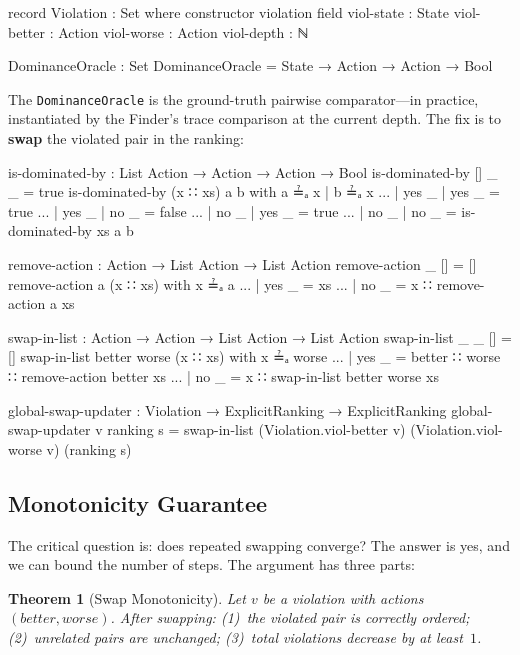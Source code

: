 \documentclass[9pt,a4paper]{article}
\theoremstyle{plain}
\newtheorem{theorem}{Theorem}
\theoremstyle{definition}
\theoremstyle{remark}
\begin{document}
\begin{code}
  record Violation : Set where
    constructor violation
    field
      viol-state  : State
      viol-better : Action
      viol-worse  : Action
      viol-depth  : ℕ

  DominanceOracle : Set
  DominanceOracle = State → Action → Action → Bool
\end{code}

\noindent The \texttt{DominanceOracle} is the ground-truth pairwise comparator---in practice, instantiated by the Finder's trace comparison at the current depth.  The fix is to \textbf{swap} the violated pair in the ranking:

\begin{code}[hide]
  is-dominated-by : List Action → Action → Action → Bool
  is-dominated-by [] _ _ = true
  is-dominated-by (x ∷ xs) a b with a ≟ₐ x | b ≟ₐ x
  ... | yes _ | yes _ = true
  ... | yes _ | no  _ = false
  ... | no  _ | yes _ = true
  ... | no  _ | no  _ = is-dominated-by xs a b

  remove-action : Action → List Action → List Action
  remove-action _ [] = []
  remove-action a (x ∷ xs) with x ≟ₐ a
  ... | yes _ = xs
  ... | no  _ = x ∷ remove-action a xs
\end{code}

\begin{code}
  swap-in-list : Action → Action → List Action → List Action
  swap-in-list _ _ [] = []
  swap-in-list better worse (x ∷ xs) with x ≟ₐ worse
  ... | yes _ = better ∷ worse ∷ remove-action better xs
  ... | no  _ = x ∷ swap-in-list better worse xs

  global-swap-updater : Violation → ExplicitRanking → ExplicitRanking
  global-swap-updater v ranking s = 
    swap-in-list (Violation.viol-better v) (Violation.viol-worse v) (ranking s)
\end{code}

\subsection{Monotonicity Guarantee}

The critical question is: does repeated swapping converge?  The answer is yes, and we can bound the number of steps.  The argument has three parts:

\begin{theorem}[Swap Monotonicity]
Let $v$ be a violation with actions $(better, worse)$. After swapping:
(1)~the violated pair is correctly ordered;
(2)~unrelated pairs are unchanged;
(3)~total violations decrease by at least~$1$.
\end{theorem}
\end{document}
